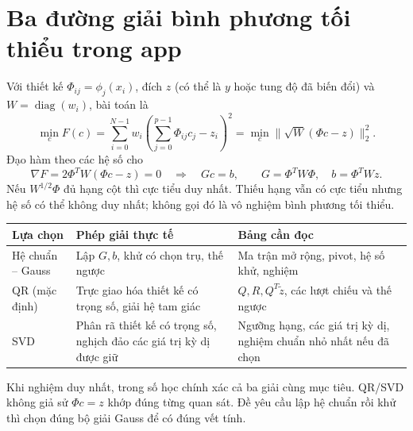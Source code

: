 \section{Ba đường giải bình phương tối thiểu trong app}
\label{sec:ls-solvers}
Với thiết kế $\Phi_{ij}=\phi_j(x_i)$, đích $z$ (có thể là $y$ hoặc tung độ đã biến đổi) và $W=\operatorname{diag}(w_i)$, bài toán là
\[
\min_c F(c)=\sum_{i=0}^{N-1}w_i\left(\sum_{j=0}^{p-1}\Phi_{ij}c_j-z_i\right)^2
          =\min_c\|\sqrt W(\Phi c-z)\|_2^2.
\]
Đạo hàm theo các hệ số cho
\[
\nabla F=2\Phi^TW(\Phi c-z)=0
\quad\Longrightarrow\quad
Gc=b,\qquad G=\Phi^TW\Phi,\quad b=\Phi^TWz.
\]
Nếu $W^{1/2}\Phi$ đủ hạng cột thì cực tiểu duy nhất. Thiếu hạng vẫn có cực tiểu nhưng hệ số có thể không duy nhất; không gọi đó là vô nghiệm bình phương tối thiểu.
\begin{center}\small\begin{tabular}{@{}p{.20\linewidth}p{.39\linewidth}p{.32\linewidth}@{}}\toprule
Lựa chọn&Phép giải thực tế&Bảng cần đọc\\\midrule
Hệ chuẩn -- Gauss&Lập $G,b$, khử có chọn trụ, thế ngược&Ma trận mở rộng, pivot, hệ số khử, nghiệm\\
QR (mặc định)&Trực giao hóa thiết kế có trọng số, giải hệ tam giác&$Q,R,Q^T\widetilde z$, các lượt chiếu và thế ngược\\
SVD&Phân rã thiết kế có trọng số, nghịch đảo các giá trị kỳ dị được giữ&Ngưỡng hạng, các giá trị kỳ dị, nghiệm chuẩn nhỏ nhất nếu đã chọn\\\bottomrule
\end{tabular}\end{center}
Khi nghiệm duy nhất, trong số học chính xác cả ba giải cùng mục tiêu. QR/SVD không giả sử $\Phi c=z$ khớp đúng từng quan sát. Đề yêu cầu lập hệ chuẩn rồi khử thì chọn đúng bộ giải Gauss để có đúng vết tính.

